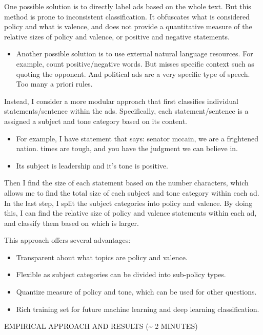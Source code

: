 \documentclass[12pt]{article}
\theoremstyle{plain}
\theoremstyle{plain}
\theoremstyle{plain}
\theoremstyle{plain}
\theoremstyle{plain}
\theoremstyle{plain}
\begin{document}
One possible solution is to directly label ads based on the whole text.
But this method is prone to inconsistent classification.
It obfuscates what is considered policy and what is valence,
and does not provide a quantitative measure of the relative sizes of policy and valence, or positive and negative statements.
\begin{itemize}
\item Another possible solution is to use external natural language resources.
For example, count positive/negative words. But misses specific context such as quoting the opponent.
And political ads are a very specific type of speech.
Too many a priori rules.
\end{itemize}

Instead, I consider a more modular approach that first classifies individual statements/sentence within the ads.
Specifically, each statement/sentence is a assigned a subject and tone category based on its content.
\begin{itemize}
\item For example, I have statement that says: senator mccain, we are a frightened nation. times are tough, and you have the judgment we can believe in.
\item Its subject is leadership and it's tone is positive.
\end{itemize}
Then I find the size of each statement based on the number characters, which allows me to find the total size of each subject and tone category within each ad.
In the last step, I split the subject categories into policy and valence.
By doing this, I can find the relative size of policy and valence statements within each ad, and classify them based on which is larger.


This approach offers several advantages:
\begin{itemize}
\item Transparent about what topics are policy and valence.
\item Flexible as subject categories can be divided into sub-policy types.
\item Quantize measure of policy and tone, which can be used for other questions.
\item Rich training set for future machine learning and deep learning classification.
\end{itemize}

\item EMPIRICAL APPROACH AND RESULTS (\textasciitilde{} 2 MINUTES)
\label{sec:org67813b7}
\end{document}
